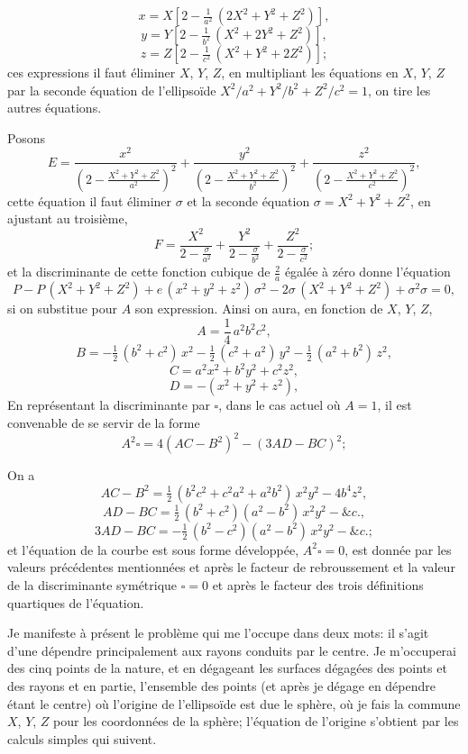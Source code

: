 \documentclass[11pt,a4paper]{article}
\begin{document}
\[
x = X\left[2-\tfrac{1}{a^2}\,(2X^2+Y^2+Z^2)\right],
\]
\[
y = Y\left[2-\tfrac{1}{b^2}\,(X^2+2Y^2+Z^2)\right],
\]
\[
z = Z\left[2-\tfrac{1}{c^2}\,(X^2+Y^2+2Z^2)\right];
\]
ces expressions il faut éliminer $X$, $Y$, $Z$, en multipliant les équations en $X$, $Y$, $Z$ par la seconde équation de l'ellipsoïde $X^2/a^2 + Y^2/b^2 + Z^2/c^2 = 1$, on tire les autres équations.

Posons
\[
E = \frac{x^2}{\left(2-\frac{X^2+Y^2+Z^2}{a^2}\right)^2} + \frac{y^2}{\left(2-\frac{X^2+Y^2+Z^2}{b^2}\right)^2} + \frac{z^2}{\left(2-\frac{X^2+Y^2+Z^2}{c^2}\right)^2},
\]
cette équation il faut éliminer $\sigma$ et la seconde équation $\sigma = X^2+Y^2+Z^2$, en ajustant au troisième,
\[
F = \frac{X^2}{2-\frac{\sigma}{a^2}} + \frac{Y^2}{2-\frac{\sigma}{b^2}} + \frac{Z^2}{2-\frac{\sigma}{c^2}};
\]
et la discriminante de cette fonction cubique de $\frac{2}{a}$ égalée à zéro donne l'équation
\[
P - P\,(X^2+Y^2+Z^2) + e\,(x^2+y^2+z^2)\,\sigma^2 - 2\sigma\,(X^2+Y^2+Z^2) + \sigma^2 \sigma = 0,
\]
si on substitue pour $A$ son expression. Ainsi on aura, en fonction de $X$, $Y$, $Z$,
\[
A = \frac{1}{4}\,a^2b^2c^2,
\]
\[
B = -\tfrac{1}{2}\,(b^2 + c^2)\,x^2 - \tfrac{1}{2}\,(c^2 + a^2)\,y^2 - \tfrac{1}{2}\,(a^2 + b^2)\,z^2,
\]
\[
C = a^2x^2 + b^2y^2 + c^2z^2,
\]
\[
D = -(x^2 + y^2 + z^2),
\]
En représentant la discriminante par $\square$, dans le cas actuel où $A = 1$, il est convenable de se servir de la forme
\[
A^2\square = 4(AC - B^2)^2 - (3AD - BC)^2;
\]

\setcounter{page}{127}

On a
\[
AC - B^2 = \tfrac{1}{2}\,(b^2c^2 + c^2a^2 + a^2b^2)\,x^2y^2 - 4b^4z^2,
\]
\[
AD - BC = \tfrac{1}{2}\,(b^2 + c^2)(a^2 - b^2)\,x^2y^2 - \&c.,
\]
\[
3AD - BC = -\tfrac{1}{2}\,(b^2 - c^2)(a^2 - b^2)\,x^2y^2 - \&c.;
\]
et l'équation de la courbe est sous forme développée, ${A^2\square = 0}$, est donnée par les valeurs précédentes mentionnées et après le facteur de rebroussement et la valeur de la discriminante symétrique $\square = 0$ et après le facteur des trois définitions quartiques de l'équation.

Je manifeste à présent le problème qui me l'occupe dans deux mots: il s'agit d'une dépendre principalement aux rayons conduits par le centre. Je m'occuperai des cinq points de la nature, et en dégageant les surfaces dégagées des points et des rayons et en partie, l'ensemble des points (et après je dégage en dépendre étant le centre) où l'origine de l'ellipsoïde est due le sphère, où je fais la commune $X$, $Y$, $Z$ pour les coordonnées de la sphère; l'équation de l'origine s'obtient par les calculs simples qui suivent.
\end{document}
